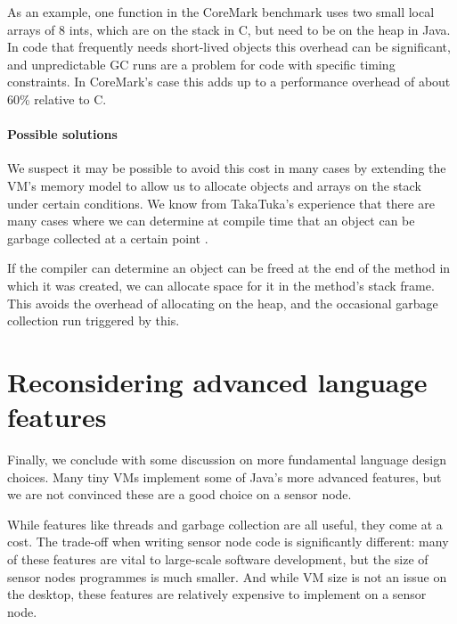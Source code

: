 As an example, one function in the CoreMark benchmark uses two small local arrays of 8 ints, which are on the stack in C, but need to be on the heap in Java. In code that frequently needs short-lived objects this overhead can be significant, and unpredictable GC runs are a problem for code with specific timing constraints. In CoreMark's case this adds up to a performance overhead of about 60\% relative to C.



\paragraph{Possible solutions}
We suspect it may be possible to avoid this cost in many cases by extending the VM's memory model to allow us to allocate objects and arrays on the stack under certain conditions. We know from TakaTuka's experience that there are many cases where we can determine at compile time that an object can be garbage collected at a certain point \cite{aslam2010optimized}.


If the compiler can determine an object can be freed at the end of the method in which it was created, we can allocate space for it in the method's stack frame. This avoids the overhead of allocating on the heap, and the occasional garbage collection run triggered by this.




\section{Reconsidering advanced language features}
\label{sec-advanced-features}
Finally, we conclude with some discussion on more fundamental language design choices. Many tiny VMs implement some of Java's more advanced features, but we are not convinced these are a good choice on a sensor node.

While features like threads and garbage collection are all useful, they come at a cost. The trade-off when writing sensor node code is significantly different: many of these features are vital to large-scale software development, but the size of sensor nodes programmes is much smaller. And while VM size is not an issue on the desktop, these features are relatively expensive to implement on a sensor node.

